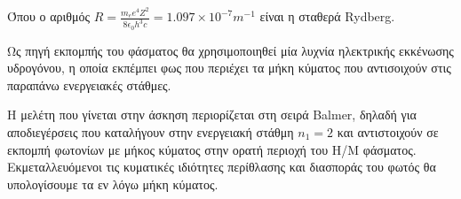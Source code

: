 \documentclass[a4paper]{article}
\begin{document}
Όπου ο αριθμός $ R = \frac{m_e e^4 Z^2}{8 \epsilon_{0} h^3 c }=1.097\times 10^{-7}m^{-1} $ είναι η σταθερά Rydberg.\newline \newline

Ως πηγή εκπομπής του φάσματος θα χρησιμοποιηθεί μία λυχνία ηλεκτρικής εκκένωσης υδρογόνου, η οποία εκπέμπει φως που περιέχει τα μήκη κύματος που αντισοιχούν στις παραπάνω ενεργειακές στάθμες.

Η μελέτη που γίνεται στην άσκηση περιορίζεται στη σειρά Balmer, δηλαδή για αποδιεγέρσεις που καταλήγουν στην ενεργειακή στάθμη $n_1 = 2$ και αντιστοιχούν σε εκπομπή φωτονίων με μήκος κύματος στην ορατή περιοχή του Η/Μ φάσματος. Εκμεταλλευόμενοι τις κυματικές ιδιότητες περίθλασης και διασποράς του φωτός θα υπολογίσουμε τα εν λόγω μήκη κύματος.
\end{document}

